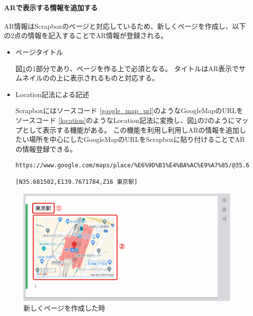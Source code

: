 \paragraph*{ARで表示する情報を追加する}
AR情報はScrapboxのページと対応しているため、新しくページを作成し、以下の2点の情報を記入することでAR情報が登録される。
\begin{itemize}
  \item ページタイトル
  
  図\ref{fig:scrapbox_ar_new}の\textcircled{\scriptsize{1}}部分であり、ページを作る上で必須となる。
  タイトルはAR表示でサムネイルのの上に表示されるものと対応する。

  \item Location記法による記述
  
  Scrapboxにはソースコード \ref{google_map_url}のようなGoogleMapのURLをソースコード \ref{location}のようなLocation記法に変換し、図\ref{fig:scrapbox_ar_new}の\textcircled{\scriptsize{2}}のようにマップとして表示する機能がある。
  この機能を利用し利用しARの情報を追加したい場所を中心にしたGoogleMapのURLをScrapboxに貼り付けることでARの情報登録できる。

  \begin{lstlisting}[caption=googleMapのURL, label=google_map_url]
    https://www.google.com/maps/place/%E6%9D%B1%E4%BA%AC%E9%A7%85/@35.681502,139.7671784,17z/data=!4m5!3m4!1s0x60188bfbd89f700b:0x277c49ba34ed38!8m2!3d35.6812362!4d139.7671248
  \end{lstlisting}

  \begin{lstlisting}[caption=Location記法, label=location]
    [N35.681502,E139.7671784,Z16 東京駅]
  \end{lstlisting}
\end{itemize}

\begin{figure}[h]
  \centering
  \includegraphics[width=120mm]{images/scrapbox_ar_new.png}
  \caption{新しくページを作成した時} \label{fig:scrapbox_ar_new}
\end{figure}

